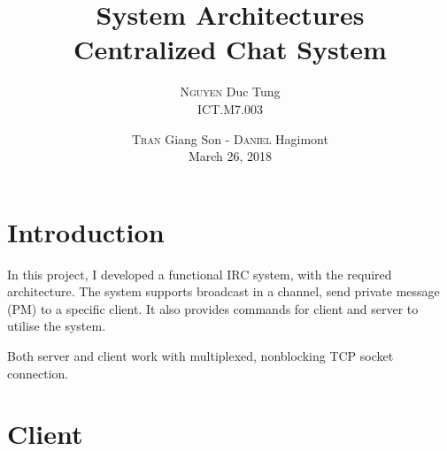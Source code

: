 \documentclass[12pt]{article}
\title{System Architectures \\ \bigskip Centralized Chat System}
\author{\textsc{Nguyen} Duc Tung \\ ICT.M7.003}
\date{\textsc{Tran} Giang Son - \textsc{Daniel} Hagimont \\ \medskip
March 26, 2018}
\begin{document}
\maketitle

\section{Introduction}

In this project, I developed a functional IRC system, with the required architecture. The system supports broadcast in a channel, send private message (PM) to a specific client. It also provides commands for client and server to utilise the system.

Both server and client work with multiplexed, nonblocking TCP socket connection.

\section{Client}
\end{document}
